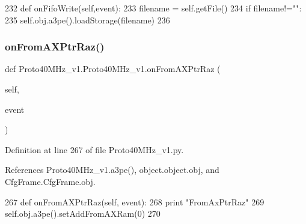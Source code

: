 \begin{DoxyCode}
232     \textcolor{keyword}{def }onFifoWrite(self,event):
233         filename = self.getFile()
234         \textcolor{keywordflow}{if} filename!=\textcolor{stringliteral}{""}:
235             self.obj.a3pe().loadStorage(filename)        
236 
\end{DoxyCode}
\mbox{\label{classProto40MHz__v1_1_1Proto40MHz__v1_a028a01486c07973be1c66d5b632cb58a}} 
\subsubsection{\texorpdfstring{on\+From\+A\+X\+Ptr\+Raz()}{onFromAXPtrRaz()}}
{\footnotesize\ttfamily def Proto40\+M\+Hz\+\_\+v1.\+Proto40\+M\+Hz\+\_\+v1.\+on\+From\+A\+X\+Ptr\+Raz (\begin{DoxyParamCaption}\item[{}]{self,  }\item[{}]{event }\end{DoxyParamCaption})}



Definition at line 267 of file Proto40\+M\+Hz\+\_\+v1.\+py.



References Proto40\+M\+Hz\+\_\+v1.\+a3pe(), object.\+object.\+obj, and Cfg\+Frame.\+Cfg\+Frame.\+obj.


\begin{DoxyCode}
267     \textcolor{keyword}{def }onFromAXPtrRaz(self, event):
268         \textcolor{keywordflow}{print} \textcolor{stringliteral}{"FromAxPtrRaz"}
269         self.obj.a3pe().setAddFromAXRam(0)
270 
\end{DoxyCode}
\mbox{\label{classProto40MHz__v1_1_1Proto40MHz__v1_aee2e5a6ae16a099c14d734eaaa119979}} 
